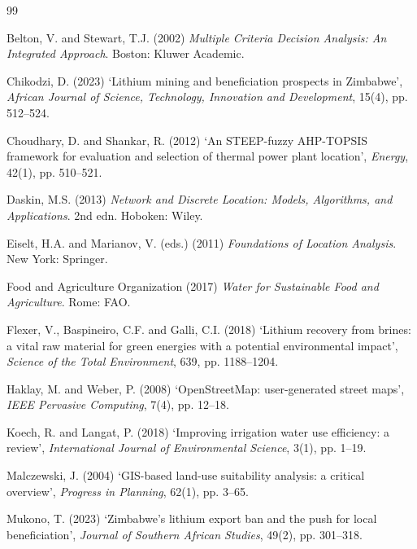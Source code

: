 \documentclass[12pt,a4paper]{report}
\begin{document}
\begin{thebibliography}{99}

Belton, V. and Stewart, T.J. (2002) \textit{Multiple Criteria Decision
Analysis: An Integrated Approach}. Boston: Kluwer Academic.

Chikodzi, D. (2023) `Lithium mining and beneficiation prospects in
Zimbabwe', \textit{African Journal of Science, Technology, Innovation
and Development}, 15(4), pp. 512--524.

Choudhary, D. and Shankar, R. (2012) `An STEEP-fuzzy AHP-TOPSIS
framework for evaluation and selection of thermal power plant
location', \textit{Energy}, 42(1), pp. 510--521.

Daskin, M.S. (2013) \textit{Network and Discrete Location: Models,
Algorithms, and Applications}. 2nd edn. Hoboken: Wiley.

Eiselt, H.A. and Marianov, V. (eds.) (2011) \textit{Foundations of
Location Analysis}. New York: Springer.

Food and Agriculture Organization (2017) \textit{Water for Sustainable
Food and Agriculture}. Rome: FAO.

Flexer, V., Baspineiro, C.F. and Galli, C.I. (2018) `Lithium recovery
from brines: a vital raw material for green energies with a potential
environmental impact', \textit{Science of the Total Environment}, 639,
pp. 1188--1204.

Haklay, M. and Weber, P. (2008) `OpenStreetMap: user-generated street
maps', \textit{IEEE Pervasive Computing}, 7(4), pp. 12--18.

Koech, R. and Langat, P. (2018) `Improving irrigation water use
efficiency: a review', \textit{International Journal of Environmental
Science}, 3(1), pp. 1--19.

Malczewski, J. (2004) `GIS-based land-use suitability analysis: a
critical overview', \textit{Progress in Planning}, 62(1), pp. 3--65.

Mukono, T. (2023) `Zimbabwe's lithium export ban and the push for
local beneficiation', \textit{Journal of Southern African Studies},
49(2), pp. 301--318.


\end{thebibliography}
\end{document}
